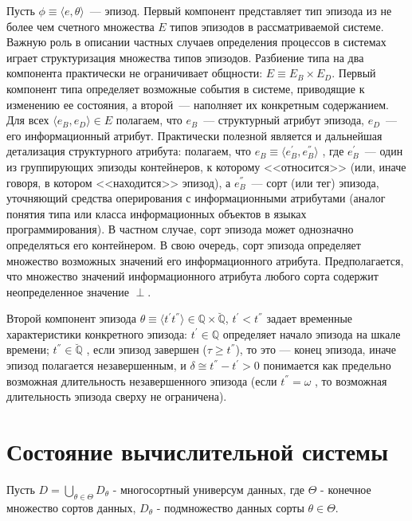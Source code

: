 Пусть $ \phi \equiv \langle e, \theta \rangle $~--- эпизод. 
Первый компонент представляет тип эпизода из не более чем счетного множества  $ E $  типов эпизодов в рассматриваемой системе. 
Важную роль в описании частных случаев определения процессов в системах играет структуризация множества типов эпизодов. 
Разбиение типа на два компонента практически не ограничивает общности: $ E \equiv E_B \times E_D $. 
Первый компонент типа определяет возможные события в системе, приводящие к изменению ее состояния, а второй~--- наполняет их конкретным содержанием. 
Для всех  $ \langle e_B, e_D \rangle \in E $  полагаем, что $ e_B $~--- структурный атрибут эпизода, $ e_D $~--- его информационный атрибут. 
Практически полезной является и дальнейшая детализация структурного атрибута: полагаем, что $ e_B \equiv \langle e_B^{'}, e_B^{''} \rangle $ , где $ e_B^{'} $~--- один из группирующих эпизоды контейнеров, к которому <<относится>> (или, иначе говоря, в котором <<находится>> эпизод), а $ e_B^{''} $~--- сорт (или тег) эпизода, уточняющий средства оперирования с информационными атрибутами (аналог понятия типа или класса информационных объектов в языках программирования). 
В частном случае, сорт эпизода может однозначно определяться его контейнером. 
В свою очередь, сорт эпизода определяет множество возможных значений его информационного атрибута. 
Предполагается, что множество значений информационного атрибута любого сорта содержит неопределенное значение  $ \perp $.

Второй компонент эпизода $ \theta \equiv \langle t^{'} t^{''} \rangle \in \mathbb{Q} \times \breve{\mathbb{Q}} $, $ t^{'}<t^{''} $ задает временные характеристики конкретного эпизода: $ t^{'}\in \mathbb{Q} $  определяет начало эпизода на шкале времени; $ t^{''}\in \breve{\mathbb{Q}} $ , если эпизод завершен ($ \tau \geq t^{''} $), то это --- конец эпизода, иначе эпизод полагается незавершенным, и $ \delta \cong t^{''}-t^{'} > 0 $ понимается как предельно возможная длительность незавершенного эпизода (если $ t^{''}=\omega $ , то возможная длительность эпизода сверху не ограничена). 

\section{Состояние вычислительной системы}

Пусть $ D = \bigcup_{\theta \in \Theta} D_\theta $ - многосортный универсум данных, где $ \Theta $ - конечное множество сортов данных, $ D_\theta $ - подмножество данных сорты $ \theta \in \Theta $.

